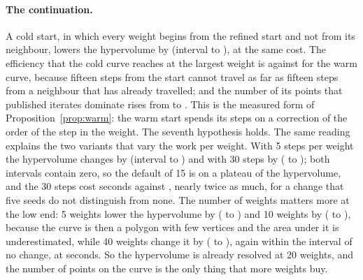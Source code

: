 \paragraph{The continuation.} A cold start, in which every weight begins from the refined start and not from its neighbour, lowers the hypervolume by \ablColdDiff{} (interval \ablColdDiffLo{} to \ablColdDiffHi), at the same cost. The efficiency that the cold curve reaches at the largest weight is \ablColdEMax{} against \ablDefaultEMax{} for the warm curve,
because fifteen steps from the start cannot travel as far as fifteen steps from a neighbour that has already travelled; and the number of its points that published iterates dominate rises from \ablDefaultDom{} to \ablColdDom{}. This is the measured form of Proposition~\ref{prop:warm}: the warm start spends its steps on a correction of the order of the step in the weight. The seventh hypothesis holds.
The same reading explains the two variants that vary the work per weight. With 5 steps per weight the hypervolume changes by \ablCgFiveDiff{} (interval \ablCgFiveDiffLo{} to \ablCgFiveDiffHi) and with 30 steps by \ablCgThirtyDiff{} (\ablCgThirtyDiffLo{} to \ablCgThirtyDiffHi); both intervals contain zero, so the default of 15 is on a plateau of the hypervolume, and the 30 steps cost \ablCgThirtySec{} seconds against \ablDefaultSec{}, nearly twice as much, for a change that five seeds do not distinguish from none.
The number of weights matters more at the low end: 5 weights lower the hypervolume by \ablNLamFiveDiff{} (\ablNLamFiveDiffLo{} to \ablNLamFiveDiffHi) and 10 weights by \ablNLamTenDiff{} (\ablNLamTenDiffLo{} to \ablNLamTenDiffHi), because the curve is then a polygon with few vertices and the area under it is underestimated, while 40 weights change it by \ablNLamFortyDiff{} (\ablNLamFortyDiffLo{} to \ablNLamFortyDiffHi), again within the interval of no change, at \ablNLamFortySec{} seconds.
So the hypervolume is already resolved at 20 weights, and the number of points on the curve is the only thing that more weights buy.

